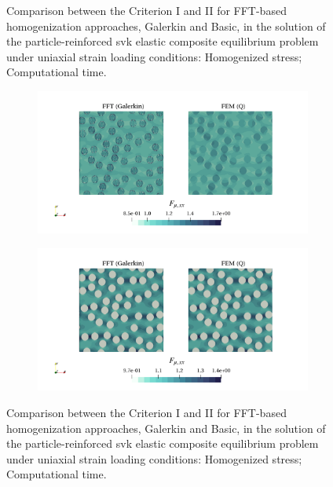 \begin{figure}[hbt]
\begin{subfigure}[b]{0.49\textwidth}
    \caption{}
    \label{subfig:svk_2D_normal_stress_avg_cpu_time_vs_n_voxels}
  \end{subfigure}
  \caption{Comparison between the Criterion I and II for FFT-based homogenization approaches, Galerkin and Basic, in the
  solution of the particle-reinforced svk elastic composite equilibrium problem under uniaxial
  strain loading conditions:  Homogenized stress;  Computational time.}
\label{fig:svk_2D_normal_stiff_contrast}
\end{figure}

\begin{figure}[hbt]
  \centering
	\begin{subfigure}[b]{\textwidth}
    \centering
    \includegraphics[width=\textwidth]{figures/svk_2D_ratio_-4_normal_strain_11}
    \caption{}
    \label{subfig:svk_2D_ratio_4_normal_strain_11}
  \end{subfigure}
  \begin{subfigure}[b]{\textwidth}
    \centering
    \includegraphics[width=\textwidth]{figures/svk_2D_ratio_4_normal_strain_11}
    \caption{}
    \label{subfig:svk_2D_ratio_-4_normal_strain_11}
  \end{subfigure}
  \caption{Comparison between the Criterion I and II for FFT-based homogenization approaches, Galerkin and Basic, in the
  solution of the particle-reinforced svk elastic composite equilibrium problem under uniaxial
  strain loading conditions:  Homogenized stress;  Computational time.}
\label{fig:svk_2D_stiff_contrast_normal_strain_11}
\end{figure}

\FloatBarrier
